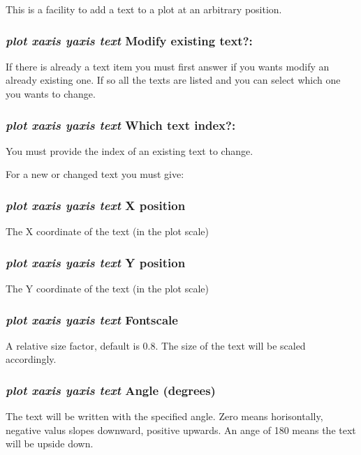 \documentclass[11pt]{article}
\begin{document}
This is a facility to add a text to a plot at an arbitrary position.

\subsubsection{{\em plot xaxis yaxis text} Modify existing text?:}

If there is already a text item you must first answer if you wants
modify an already existing one.  If so all the texts are listed and
you can select which one you wants to change.

\subsubsection{{\em plot xaxis yaxis text} Which text index?:}

You must provide the index of an existing text to change.

For a new or changed text you must give:

\subsubsection{{\em plot xaxis yaxis text}  X position}

The X coordinate of the text (in the plot scale)

\subsubsection{{\em plot xaxis yaxis text} Y position}

The Y coordinate of the text (in the plot scale)

\subsubsection{{\em plot xaxis yaxis text} Fontscale}

A relative size factor, default is 0.8.  The size of the text will be
scaled accordingly.

\subsubsection{{\em plot xaxis yaxis text} Angle (degrees)}

The text will be written with the specified angle. Zero means
horisontally, negative valus slopes downward, positive upwards. An
ange of 180 means the text will be upside down.
\end{document}
